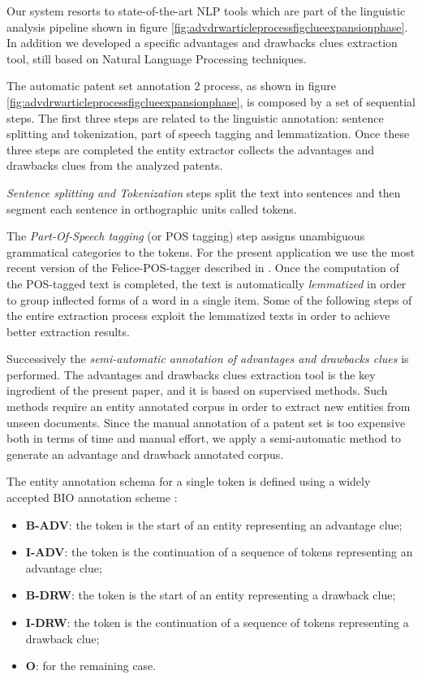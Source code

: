 \documentclass[]{book}
\providecommand{\tightlist}{%
  \setlength{\itemsep}{0pt}\setlength{\parskip}{0pt}}
\begin{document}
Our system resorts to state-of-the-art NLP tools which are part of the
linguistic analysis pipeline shown in figure
\ref{fig:advdrwarticleprocessfigclueexpansionphase}. In addition we
developed a specific advantages and drawbacks clues extraction tool,
still based on Natural Language Processing techniques.

The automatic patent set annotation 2 process, as shown in figure
\ref{fig:advdrwarticleprocessfigclueexpansionphase}, is composed by a
set of sequential steps. The first three steps are related to the
linguistic annotation: sentence splitting and tokenization, part of
speech tagging and lemmatization. Once these three steps are completed
the entity extractor collects the advantages and drawbacks clues from
the analyzed patents.

\emph{Sentence splitting and Tokenization} steps split the text into
sentences and then segment each sentence in orthographic units called
tokens.

The \emph{Part-Of-Speech tagging} (or POS tagging) step assigns
unambiguous grammatical categories to the tokens. For the present
application we use the most recent version of the Felice-POS-tagger
described in \citep{dell2009ensemble}. Once the computation of the
POS-tagged text is completed, the text is automatically
\emph{lemmatized} in order to group inflected forms of a word in a
single item. Some of the following steps of the entire extraction
process exploit the lemmatized texts in order to achieve better
extraction results.

Successively the \emph{semi-automatic annotation of advantages and
drawbacks clues} is performed. The advantages and drawbacks clues
extraction tool is the key ingredient of the present paper, and it is
based on supervised methods. Such methods require an entity annotated
corpus in order to extract new entities from unseen documents. Since the
manual annotation of a patent set is too expensive both in terms of time
and manual effort, we apply a semi-automatic method to generate an
advantage and drawback annotated corpus.

The entity annotation schema for a single token is defined using a
widely accepted BIO annotation scheme \citep{ramshaw}:

\begin{itemize}
\tightlist
\item
  \textbf{B-ADV}: the token is the start of an entity representing an
  advantage clue;
\item
  \textbf{I-ADV}: the token is the continuation of a sequence of tokens
  representing an advantage clue;
\item
  \textbf{B-DRW}: the token is the start of an entity representing a
  drawback clue;
\item
  \textbf{I-DRW}: the token is the continuation of a sequence of tokens
  representing a drawback clue;
\item
  \textbf{O}: for the remaining case.
\end{itemize}
\end{document}
